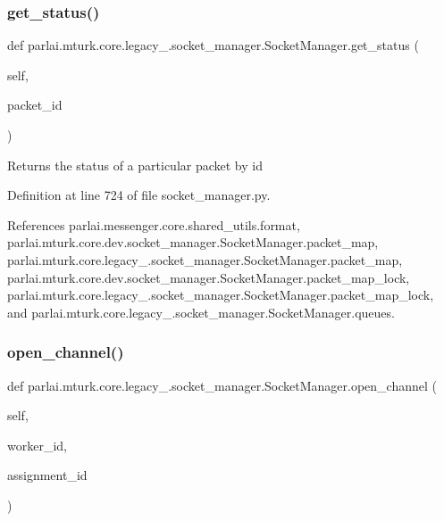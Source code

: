 \subsubsection{\texorpdfstring{get\+\_\+status()}{get\_status()}}
{\footnotesize\ttfamily def parlai.\+mturk.\+core.\+legacy\+\_.\+socket\+\_\+manager.\+Socket\+Manager.\+get\+\_\+status (\begin{DoxyParamCaption}\item[{}]{self,  }\item[{}]{packet\+\_\+id }\end{DoxyParamCaption})}

\begin{DoxyVerb}Returns the status of a particular packet by id\end{DoxyVerb}
 

Definition at line 724 of file socket\+\_\+manager.\+py.



References parlai.\+messenger.\+core.\+shared\+\_\+utils.\+format, parlai.\+mturk.\+core.\+dev.\+socket\+\_\+manager.\+Socket\+Manager.\+packet\+\_\+map, parlai.\+mturk.\+core.\+legacy\+\_.\+socket\+\_\+manager.\+Socket\+Manager.\+packet\+\_\+map, parlai.\+mturk.\+core.\+dev.\+socket\+\_\+manager.\+Socket\+Manager.\+packet\+\_\+map\+\_\+lock, parlai.\+mturk.\+core.\+legacy\+\_.\+socket\+\_\+manager.\+Socket\+Manager.\+packet\+\_\+map\+\_\+lock, and parlai.\+mturk.\+core.\+legacy\+\_.\+socket\+\_\+manager.\+Socket\+Manager.\+queues.

\mbox{\label{classparlai_1_1mturk_1_1core_1_1legacy__2018_1_1socket__manager_1_1SocketManager_a736cdf9b5be6d3fee7f88cf7893b56f0}} 
\subsubsection{\texorpdfstring{open\+\_\+channel()}{open\_channel()}}
{\footnotesize\ttfamily def parlai.\+mturk.\+core.\+legacy\+\_.\+socket\+\_\+manager.\+Socket\+Manager.\+open\+\_\+channel (\begin{DoxyParamCaption}\item[{}]{self,  }\item[{}]{worker\+\_\+id,  }\item[{}]{assignment\+\_\+id }\end{DoxyParamCaption})}

